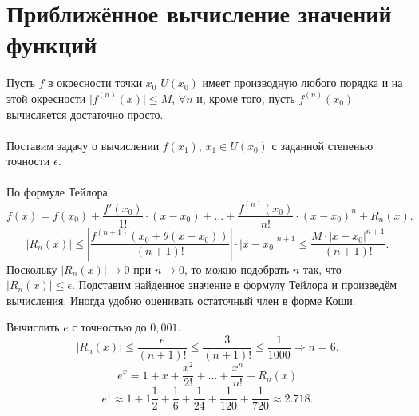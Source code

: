 	\section{Приближённое вычисление значений функций} %
	Пусть $f$  в окресности точки $x_0$ $U(x_0)$ имеет производную любого порядка и на этой окресности $\mid f ^{(n)} (x) \mid \le M$, $\forall n$ и, кроме того, пусть $f ^{(n)} (x_0)$ вычисляется достаточно просто.\\\\
	Поставим задачу о вычислении $f(x_1)$, $x_1 \in U(x_0)$ с заданной степенью точности $\epsilon$.\\\\ По формуле Тейлора
	$$f(x) = f(x_0) + \frac{f\prime(x_0)}{1!} \cdot (x - x_0) + \dots + \frac{f^{(n)}(x_0)}{n!} \cdot (x - x_0)^n + R_n(x).$$
	$$\left| R_n(x) \right| \leq \left| \frac{ f^{(n + 1)}(x_0 + \theta(x - x_0)) }{(n+1)!}\right| \cdot {\left| x - x_0 \right|} ^{n + 1} \le \frac{M \cdot {\left| x - x_0 \right|} ^{n + 1}}{(n+1)!}.$$
	Поскольку $\left| R_n(x) \right| \rightarrow 0$  при $n \rightarrow 0$, то можно подобрать $n$ так, что $\left| R_n(x) \right| \le \epsilon$. Подставим найденное значение в формулу Тейлора и произведём вычисления. Иногда удобно оценивать остаточный член в форме Коши.\\
	\begin{example} 
		Вычислить $e$  с точностью до $0,001$.\\
		$$\left| R_n(x) \right| \le \frac{e}{(n + 1)!} \le \frac{3}{(n + 1)!} \le \frac{1}{1000} \Rightarrow n = 6.$$
		$$e^x =1 + x + \frac{x^2}{2!} + \dots + \frac{x^n}{n!} + R_n(x)$$
		$$e^1 \approx 1 + 1 \frac{1}{2} + \frac{1}{6} + \frac{1}{24} + \frac{1}{120} + \frac{1}{720} \approx 2.718.$$
	\end{example}
